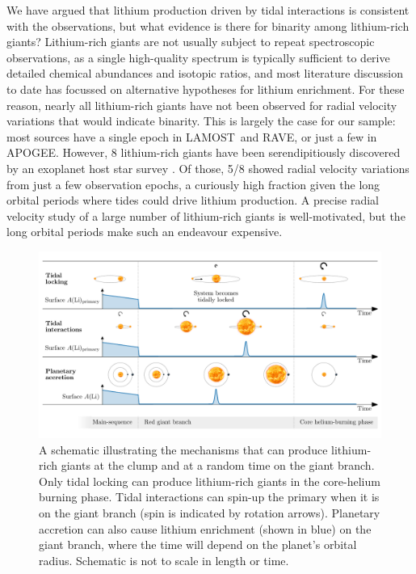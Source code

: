 \documentclass[twocolumn]{aastex62}
\newcommand\lamost{LAMOST}
\newcommand\apogee{APOGEE}
\newcommand\rave{RAVE}
\begin{document}
We have argued that lithium production driven by tidal interactions is consistent
with the observations, but what evidence is there for binarity among lithium-rich
giants? Lithium-rich giants are not usually subject to repeat spectroscopic observations,
as a single high-quality spectrum is typically sufficient to derive detailed chemical
abundances and isotopic ratios, and most literature discussion to date has focussed 
on alternative hypotheses for lithium enrichment. For these reason, nearly all 
lithium-rich giants have not been observed for radial velocity variations that would indicate binarity. This is largely the case for our sample: most sources have a single
epoch in \lamost\ and \rave, or just a few in \apogee. 
However, 8 lithium-rich giants have been serendipitiously discovered by an
exoplanet host star survey \citep{Adamow_2015}. Of those, 5/8 showed radial velocity
variations from just a few observation epochs, a curiously high fraction given the long orbital periods
where tides could drive lithium production.
A precise radial velocity study of a large number of lithium-rich giants 
is well-motivated, but the long orbital periods make such an endeavour expensive.




\begin{figure}
	\includegraphics[width=\textwidth]{diagram}
	\caption{
		A schematic illustrating the mechanisms that can produce lithium-rich giants at the clump and at a random time on the giant branch. 
		Only tidal locking can produce lithium-rich giants in the core-helium burning phase. Tidal interactions can spin-up the primary when it is on the giant branch (spin is indicated by rotation arrows). Planetary accretion can also cause lithium enrichment (shown in blue) on the giant branch, where the time will depend on the planet's orbital radius. Schematic is not to scale in length or time.}
	\label{fig:diagram}
\end{figure}
\end{document}

